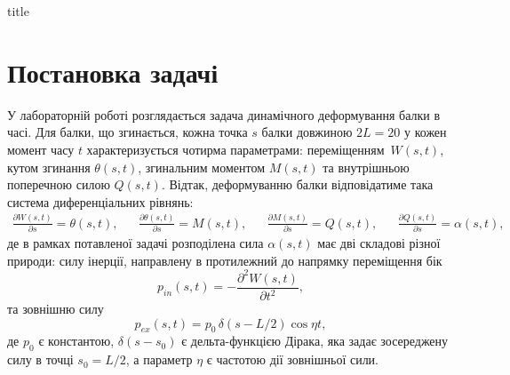 \documentclass{mathreport}
\begin{document}




{title}

\tableofcontents

\newpage

\section{Постановка задачі}

У лабораторній роботі розглядається задача динамічного деформування балки в часі. Для балки, що згинається, кожна точка $s$ балки довжиною $2L=20$ у кожен момент часу $t$ характеризується чотирма параметрами: переміщенням~$W(s,t)$, кутом згинання $\theta(s,t)$, згинальним моментом $M(s,t)$ та внутрішньою поперечною силою $Q(s,t)$. Відтак, деформуванню балки відповідатиме така система диференціальних рівнянь:
\begin{align}\label{eq: initial d.e.}
    \frac{\partial W(s,t)}{\partial s} = \theta(s,t), &&  \frac{\partial\theta(s,t)}{\partial s} = M(s,t), && \frac{\partial M(s,t)}{\partial s} = Q(s,t), && \frac{\partial Q(s,t)}{\partial s} = \alpha(s,t),
\end{align}
де в рамках потавленої задачі розподілена сила $\alpha(s,t)$ має дві складові різної природи: силу інерції, направлену в протилежний до напрямку переміщення бік
\begin{equation}\label{eq: inertia force}
    p_{in}(s,t) = -\frac{\partial^2 W(s,t)}{\partial t^2},
\end{equation}
та зовнішню силу
\begin{equation}\label{eq: external force}
    p_{ex}(s,t) = p_0\, \delta(s-L/2) \cos{\eta t},
\end{equation}
де $p_0$ є константою, $\delta(s-s_0)$ є дельта-функцією Дірака, яка задає зосереджену силу в точці $s_0=L/2$, а параметр $\eta$ є частотою дії зовнішньої сили. 
\end{document}
